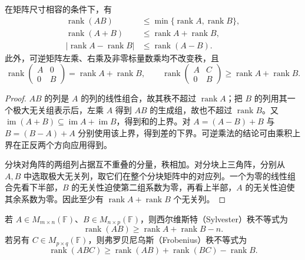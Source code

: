 \begin{proposition}
\label{prop:laex-rank-basic}
在矩阵尺寸相容的条件下，有
\begin{align}
\operatorname{rank}(AB)&\le\min\{\operatorname{rank}A,\operatorname{rank}B\},
\label{eq:laex-product-upper}\\
\operatorname{rank}(A+B)&\le\operatorname{rank}A+\operatorname{rank}B,
\label{eq:laex-sum-upper}\\
\bigl|\operatorname{rank}A-\operatorname{rank}B\bigr|
&\le\operatorname{rank}(A-B).
\label{eq:laex-difference-lower}
\end{align}
此外，可逆矩阵左乘、右乘及非零标量数乘均不改变秩，且
\begin{equation}
\label{eq:laex-block-diagonal-rank}
\operatorname{rank}\begin{pmatrix}A&0\\0&B\end{pmatrix}
=\operatorname{rank}A+\operatorname{rank}B,
\qquad
\operatorname{rank}\begin{pmatrix}A&C\\0&B\end{pmatrix}
\ge\operatorname{rank}A+\operatorname{rank}B.
\end{equation}
\end{proposition}

\begin{proof}
$AB$ 的列是 $A$ 的列的线性组合，故其秩不超过 $\operatorname{rank}A$；把 $B$ 的列用其一个极大无关组表示后，左乘 $A$ 得到 $AB$ 的生成组，故也不超过 $\operatorname{rank}B$。又 $\operatorname{im}(A+B)\subseteq\operatorname{im}A+\operatorname{im}B$，得到和的上界。对 $A=(A-B)+B$ 与 $B=(B-A)+A$ 分别使用该上界，得到差的下界。可逆乘法的结论可由乘积上界在正反两个方向应用得到。

分块对角阵的两组列占据互不重叠的分量，秩相加。对分块上三角阵，分别从 $A,B$ 中选取极大无关列，取它们在整个分块矩阵中的对应列。一个为零的线性组合先看下半部，$B$ 的无关性迫使第二组系数为零，再看上半部，$A$ 的无关性迫使其余系数为零。因此至少有 $\operatorname{rank}A+\operatorname{rank}B$ 个无关列。
\end{proof}

\begin{theorem}
\label{thm:laex-sylvester-frobenius}
若 $A\in M_{m\times n}(\mathbb F)$、$B\in M_{n\times p}(\mathbb F)$，则西尔维斯特（Sylvester）秩不等式为
\begin{equation}
\label{eq:laex-sylvester}
\operatorname{rank}(AB)\ge\operatorname{rank}A+\operatorname{rank}B-n.
\end{equation}
若另有 $C\in M_{p\times q}(\mathbb F)$，则弗罗贝尼乌斯（Frobenius）秩不等式为
\begin{equation}
\label{eq:laex-frobenius}
\operatorname{rank}(ABC)\ge
\operatorname{rank}(AB)+\operatorname{rank}(BC)-\operatorname{rank}B.
\end{equation}
\end{theorem}

